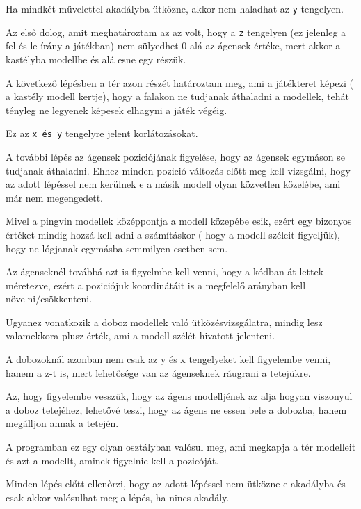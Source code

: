 Ha mindkét művelettel akadályba ütközne, akkor nem haladhat az \texttt{y} tengelyen.

Az első dolog, amit meghatároztam az az volt, hogy a \texttt{z} tengelyen (ez jelenleg a fel és le írány a játékban) nem sülyedhet 0 alá az ágensek értéke, mert akkor a kastélyba modellbe és alá esne egy részük.

A következő lépésben a tér azon részét határoztam meg, ami a játékteret képezi ( a kastély modell kertje), hogy a falakon ne tudjanak áthaladni a modellek, tehát tényleg ne legyenek képesek elhagyni a játék végéig.

Ez az \texttt{x és y} tengelyre jelent korlátozásokat.

A további lépés az ágensek poziciójának figyelése, hogy az ágensek egymáson se tudjanak áthaladni. Ehhez minden pozició változás előtt meg kell vizsgálni, hogy az adott lépéssel nem kerülnek e a másik modell olyan közvetlen közelébe, ami már nem megengedett.

Mivel a pingvin modellek középpontja a modell közepébe esik, ezért egy bizonyos értéket mindig hozzá kell adni a számításkor ( hogy a modell széleit figyeljük), hogy ne lógjanak egymásba semmilyen esetben sem.

Az ágenseknél továbbá azt is figyelmbe kell venni, hogy a kódban át lettek méretezve, ezért a poziciójuk koordinátáit is a megfelelő arányban kell növelni/csökkenteni.

Ugyanez vonatkozik a doboz modellek való ütközésvizsgálatra, mindig lesz valamekkora plusz érték, ami a modell szélét hivatott jelenteni.

A dobozoknál azonban nem csak az y és x tengelyeket kell figyelembe venni, hanem a z-t is, mert lehetősége van az ágenseknek ráugrani a tetejükre.

Az, hogy figyelembe vesszük, hogy az ágens modelljének az alja hogyan viszonyul a doboz tetejéhez, lehetővé teszi, hogy az ágens ne essen bele a dobozba, hanem megálljon annak a tetején.

A programban ez egy olyan osztályban valósul meg, ami megkapja a tér modelleit és azt a modellt, aminek figyelnie kell a pozicóját.

Minden lépés előtt ellenőrzi, hogy az adott lépéssel nem ütközne-e akadályba és csak akkor valósulhat meg a lépés, ha nincs akadály.



